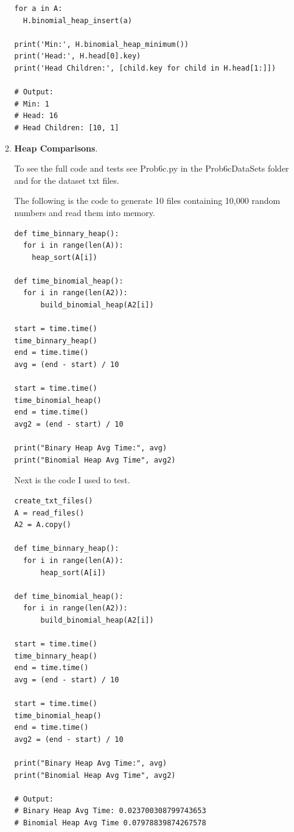 \documentclass{article}
\begin{document}
\begin{enumerate}
\begin{enumerate}
\begin{lstlisting}
for a in A:
  H.binomial_heap_insert(a)

print('Min:', H.binomial_heap_minimum())
print('Head:', H.head[0].key)
print('Head Children:', [child.key for child in H.head[1:]])

# Output: 
# Min: 1
# Head: 16
# Head Children: [10, 1]
    \end{lstlisting}

    \item \textbf{Heap Comparisons}.

    To see the full code and tests see Prob6c.py in the Prob6cDataSets folder and for the dataset txt files.

    The following is the code to generate 10 files containing 10,000 random numbers and read them into memory.

    \begin{lstlisting}
def time_binnary_heap():
  for i in range(len(A)):
    heap_sort(A[i])

def time_binomial_heap():
  for i in range(len(A2)):
      build_binomial_heap(A2[i])

start = time.time()
time_binnary_heap()
end = time.time()                   
avg = (end - start) / 10
                  
start = time.time()
time_binomial_heap()
end = time.time()                   
avg2 = (end - start) / 10
    
print("Binary Heap Avg Time:", avg)    
print("Binomial Heap Avg Time", avg2)
    \end{lstlisting}

    Next is the code I used to test.

    \begin{lstlisting}
create_txt_files()
A = read_files()
A2 = A.copy()

def time_binnary_heap():
  for i in range(len(A)):
      heap_sort(A[i])

def time_binomial_heap():
  for i in range(len(A2)):
      build_binomial_heap(A2[i])

start = time.time()
time_binnary_heap()
end = time.time()                   
avg = (end - start) / 10
                
start = time.time()
time_binomial_heap()
end = time.time()                   
avg2 = (end - start) / 10
  
print("Binary Heap Avg Time:", avg)    
print("Binomial Heap Avg Time", avg2)

# Output: 
# Binary Heap Avg Time: 0.023700308799743653
# Binomial Heap Avg Time 0.07978839874267578
    \end{lstlisting}    


\end{enumerate}
\end{enumerate}
\end{document}
